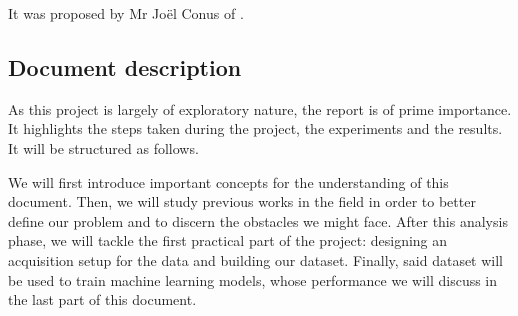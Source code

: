 It was proposed by Mr Joël Conus of \TBindustryName.

\subsection{Document description}

As this project is largely of exploratory nature, the report is of prime importance. It highlights the steps taken during the project, the experiments and the results. It will be structured as follows.

We will first introduce important concepts for the understanding of this document. Then, we will study previous works in the field in order to better define our problem and to discern the obstacles we might face. After this analysis phase, we will tackle the first practical part of the project: designing an acquisition setup for the data and building our dataset. Finally, said dataset will be used to train machine learning models, whose performance we will discuss in the last part of this document.
